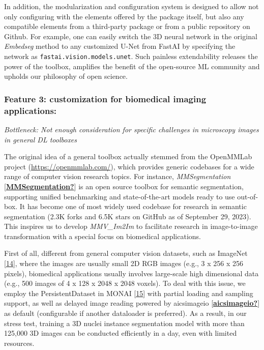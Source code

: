 In addition, the modularization and configuration system is designed to allow not only configuring with the elements offered by the package itself, but also any compatible elements from a third-party package or from a public repository on Github. For example, one can easily switch the 3D neural network in the original \emph{Embedseg} method to any customized U-Net from FastAI by specifying the network as \texttt{fastai.vision.models.unet}. Such painless extendability releases the power of the toolbox, amplifies the benefit of the open-source ML community and upholds our philosophy of open science.

\hypertarget{feature-3-customization-for-biomedical-imaging-applications}{%
\subsubsection{Feature 3: customization for biomedical imaging applications:}\label{feature-3-customization-for-biomedical-imaging-applications}}

\emph{Bottleneck: Not enough consideration for specific challenges in microscopy images in general DL toolboxes}

The original idea of a general toolbox actually stemmed from the OpenMMLab project (\url{https://openmmlab.com/}), which provides generic codebases for a wide range of computer vision research topics. For instance, \emph{MMSegmentation} {[}\protect\hyperlink{ref-MMSegmentation}{\textbf{MMSegmentation?}}{]} is an open source toolbox for semantic segmentation, supporting unified benchmarking and state-of-the-art models ready to use out-of-box. It has become one of most widely used codebase for research in semantic segmentation (2.3K forks and 6.5K stars on GitHub as of September 29, 2023). This inspires us to develop \emph{MMV\_Im2Im} to facilitate research in image-to-image transformation with a special focus on biomedical applications.

First of all, different from general computer vision datasets, such as ImageNet {[}\protect\hyperlink{ref-lt4BNUoG}{14}{]}, where the images are usually small 2D RGB images (e.g., 3 x 256 x 256 pixels), biomedical applications usually involves large-scale high dimensional data (e.g., 500 images of 4 x 128 x 2048 x 2048 voxels). To deal with this issue, we employ the PersistentDataset in MONAI {[}\protect\hyperlink{ref-UU62HYC6}{15}{]} with partial loading and sampling support, as well as delayed image reading powered by aicsimageio {[}\protect\hyperlink{ref-aicsimageio}{\textbf{aicsimageio?}}{]} as default (configurable if another dataloader is preferred). As a result, in our stress test, training a 3D nuclei instance segmentation model with more than 125,000 3D images can be conducted efficiently in a day, even with limited resources.


